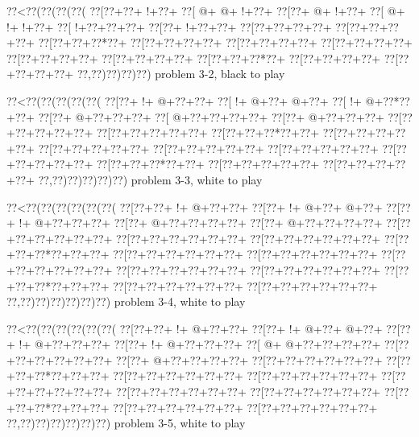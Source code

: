 \vbox{\vbox{\goo
\0??<\0??(\0??(\0??(\0??(
\0??[\0??+\0??+\- !+\0??+
\0??[\- @+\- @+\- !+\0??+
\0??[\0??+\- @+\- !+\0??+
\0??[\- @+\- !+\- !+\0??+
\0??[\- !+\0??+\0??+\0??+
\0??[\0??+\- !+\0??+\0??+
\0??[\0??+\0??+\0??+\0??+
\0??[\0??+\0??+\0??+\0??+
\0??[\0??+\0??+\0??*\0??+
\0??[\0??+\0??+\0??+\0??+
\0??[\0??+\0??+\0??+\0??+
\0??[\0??+\0??+\0??+\0??+
\0??[\0??+\0??+\0??+\0??+
\0??[\0??+\0??+\0??+\0??+
\0??[\0??+\0??+\0??*\0??+
\0??[\0??+\0??+\0??+\0??+
\0??[\0??+\0??+\0??+\0??+
\0??,\0??)\0??)\0??)\0??)
}
\hfil problem 3-2, black to play\hfil\break
}

\vbox{\vbox{\goo
\0??<\0??(\0??(\0??(\0??(\0??(
\0??[\0??+\- !+\- @+\0??+\0??+
\0??[\- !+\- @+\0??+\- @+\0??+
\0??[\- !+\- @+\0??*\0??+\0??+
\0??[\0??+\- @+\0??+\0??+\0??+
\0??[\- @+\0??+\0??+\0??+\0??+
\0??[\0??+\- @+\0??+\0??+\0??+
\0??[\0??+\0??+\0??+\0??+\0??+
\0??[\0??+\0??+\0??+\0??+\0??+
\0??[\0??+\0??+\0??*\0??+\0??+
\0??[\0??+\0??+\0??+\0??+\0??+
\0??[\0??+\0??+\0??+\0??+\0??+
\0??[\0??+\0??+\0??+\0??+\0??+
\0??[\0??+\0??+\0??+\0??+\0??+
\0??[\0??+\0??+\0??+\0??+\0??+
\0??[\0??+\0??+\0??*\0??+\0??+
\0??[\0??+\0??+\0??+\0??+\0??+
\0??[\0??+\0??+\0??+\0??+\0??+
\0??,\0??)\0??)\0??)\0??)\0??)
}
\hfil problem 3-3, white to play\hfil\break
}

\vbox{\vbox{\goo
\0??<\0??(\0??(\0??(\0??(\0??(\0??(
\0??[\0??+\0??+\- !+\- @+\0??+\0??+
\0??[\0??+\- !+\- @+\0??+\- @+\0??+
\0??[\0??+\- !+\- @+\0??+\0??+\0??+
\0??[\0??+\- @+\0??+\0??+\0??+\0??+
\0??[\0??+\- @+\0??+\0??+\0??+\0??+
\0??[\0??+\0??+\0??+\0??+\0??+\0??+
\0??[\0??+\0??+\0??+\0??+\0??+\0??+
\0??[\0??+\0??+\0??+\0??+\0??+\0??+
\0??[\0??+\0??+\0??*\0??+\0??+\0??+
\0??[\0??+\0??+\0??+\0??+\0??+\0??+
\0??[\0??+\0??+\0??+\0??+\0??+\0??+
\0??[\0??+\0??+\0??+\0??+\0??+\0??+
\0??[\0??+\0??+\0??+\0??+\0??+\0??+
\0??[\0??+\0??+\0??+\0??+\0??+\0??+
\0??[\0??+\0??+\0??*\0??+\0??+\0??+
\0??[\0??+\0??+\0??+\0??+\0??+\0??+
\0??[\0??+\0??+\0??+\0??+\0??+\0??+
\0??,\0??)\0??)\0??)\0??)\0??)\0??)
}
\hfil problem 3-4, white to play\hfil\break
}

\vbox{\vbox{\goo
\0??<\0??(\0??(\0??(\0??(\0??(\0??(
\0??[\0??+\0??+\- !+\- @+\0??+\0??+
\0??[\0??+\- !+\- @+\0??+\- @+\0??+
\0??[\0??+\- !+\- @+\0??+\0??+\0??+
\0??[\0??+\- !+\- @+\0??+\0??+\0??+
\0??[\- @+\- @+\0??+\0??+\0??+\0??+
\0??[\0??+\0??+\0??+\0??+\0??+\0??+
\0??[\0??+\- @+\0??+\0??+\0??+\0??+
\0??[\0??+\0??+\0??+\0??+\0??+\0??+
\0??[\0??+\0??+\0??*\0??+\0??+\0??+
\0??[\0??+\0??+\0??+\0??+\0??+\0??+
\0??[\0??+\0??+\0??+\0??+\0??+\0??+
\0??[\0??+\0??+\0??+\0??+\0??+\0??+
\0??[\0??+\0??+\0??+\0??+\0??+\0??+
\0??[\0??+\0??+\0??+\0??+\0??+\0??+
\0??[\0??+\0??+\0??*\0??+\0??+\0??+
\0??[\0??+\0??+\0??+\0??+\0??+\0??+
\0??[\0??+\0??+\0??+\0??+\0??+\0??+
\0??,\0??)\0??)\0??)\0??)\0??)\0??)
}
\hfil problem 3-5, white to play\hfil\break
}

